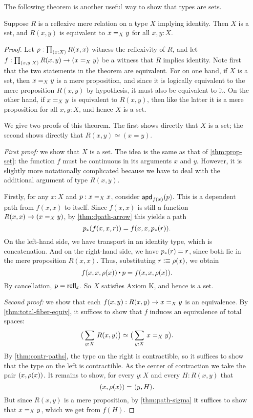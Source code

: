 The following theorem is another useful way to show that types are sets.

\begin{thm}\label{thm:h-set-refrel-in-paths-sets}
  Suppose $R$ is a reflexive mere relation on a type $X$ implying identity.
  Then $X$ is a set, and $R(x,y)$ is equivalent to $\id[X]{x}{y}$ for all $x,y:X$.
\end{thm}

\begin{proof}
  Let $\rho : \prd{x:X} R(x,x)$ witness the reflexivity of $R$, and let $f : \prd{x,y:X} R(x,y) \to (\id[X]{x}{y})$ be a witness that $R$
implies identity.
  Note first that the two statements in the theorem are equivalent.
  For on one hand, if $X$ is a set, then $\id[X]xy$ is a mere proposition, and since it is logically equivalent to the mere proposition
$R(x,y)$ by hypothesis, it must also be equivalent to it.
  On the other hand, if $\id[X]xy$ is equivalent to $R(x,y)$, then like the latter it is a mere proposition for all $x,y:X$, and hence $X$
is a set.

  We give two proofs of this theorem.
  The first shows directly that $X$ is a set; the second shows directly that $R(x,y)\simeq (x=y)$.

  \emph{First proof:} we show that $X$ is a set.
  The idea is the same as that of \autoref{thm:prop-set}: the function $f$ must be continuous in its arguments $x$ and $y$.
  However, it is slightly more notationally complicated because we have to deal with the additional argument of type $R(x,y)$.

  Firstly, for any $x:X$ and $p:\id[X]xx$, consider $\apdfunc{f(x)}(p)$.
  This is a dependent path from $f(x,x)$ to itself.
  Since $f(x,x)$ is still a function $R(x,x) \to (\id[X]xy)$, by \autoref{thm:dpath-arrow} this yields a path
  \[\trans{p}{f(x,x,r)} = f(x,x,\trans{p}r).
  \]
  On the left-hand side, we have transport in an identity type, which is concatenation.
  And on the right-hand side, we have $\trans{p}r = r$, since both lie in the mere proposition $R(x,x)$.
  Thus, substituting $r\defeq \rho(x)$, we obtain
  \[ f(x,x,\rho(x)) \ct p = f(x,x,\rho(x)). \]
  By cancellation, $p=\refl{x}$.
  So $X$ satisfies Axiom K, and hence is a set.

  \emph{Second proof:} we show that each $f(x,y) : R(x,y) \to \id[X]{x}{y}$ is an equivalence.
  By \autoref{thm:total-fiber-equiv}, it suffices to show that $f$ induces an equivalence of total spaces:
  \begin{equation*}
    \eqv{\big(\sm{y:X}R(x,y)\big)}{\big(\sm{y:X}\id[X]{x}{y}\big)}.
  \end{equation*}
  By \autoref{thm:contr-paths}, the type on the right is contractible, so it
  suffices to show that the type on the left is contractible. As the center of
  contraction we take the pair $\pairr{x,\rho(x)}$.  It remains to show, for
  every ${y:X}$ and every ${H:R(x,y)}$ that
  \begin{equation*}
    \id{\pairr{x,\rho(x)}}{\pairr{y,H}}.
  \end{equation*}
  But since $R(x,y)$ is a mere proposition, by \autoref{thm:path-sigma} it suffices to show that
  $\id[X]{x}{y}$, which we get from $f(H)$.
\end{proof}


